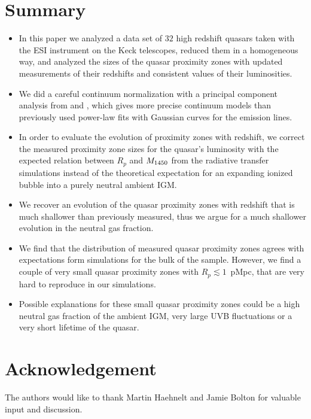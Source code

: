 \documentclass[iop]{emulateapj}
\newcommand{\hii} {\ion{H}{2}\xspace}
\begin{document}
\section{Summary}\label{sec:summary}
\begin{itemize}
\item In this paper we analyzed a data set of $32$ high redshift quasars taken with the ESI instrument on the Keck telescopes, reduced them in a homogeneous way, and analyzed the sizes of the quasar proximity zones with updated measurements of their redshifts and consistent values of their luminosities. 
\item We did a careful continuum normalization with a principal component analysis from \citet{Paris2011} and \citet{Suzuki2006}, which gives more precise continuum models than previously used power-law fits with Gaussian curves for the emission lines. 
\item In order to evaluate the evolution of proximity zones with redshift, we correct the measured proximity zone sizes for the quasar's luminosity with the expected relation between $R_p$ and $M_{\rm 1450}$ from the radiative transfer simulations instead of the theoretical expectation for an expanding ionized \hii bubble into a purely neutral ambient IGM. 
\item We recover an evolution of the quasar proximity zones with redshift that is much shallower than previously measured, thus we argue for a much shallower evolution in the neutral gas fraction. 
\item We find that the distribution of measured quasar proximity zones agrees with expectations form simulations for the bulk of the sample. However, we find a couple of very small quasar proximity zones with $R_p\lesssim 1$~pMpc, that are very hard to reproduce in our simulations. 
\item Possible explanations for these small quasar proximity zones could be a high neutral gas fraction of the ambient IGM, very large UVB fluctuations or a very short lifetime of the quasar. 
\end{itemize}



\section*{Acknowledgement}
The authors would like to thank Martin Haehnelt and Jamie Bolton for valuable input and discussion. 


\end{document}
